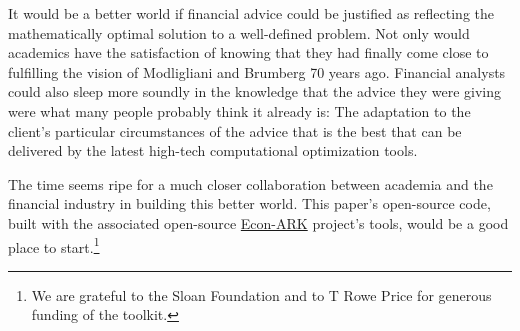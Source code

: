 \documentclass{article}
\begin{document}
It would be a better world if financial advice could be justified as reflecting the mathematically optimal solution to a well-defined problem.  Not only would academics have the satisfaction of knowing that they had finally come close to fulfilling the vision of Modligliani and Brumberg 70 years ago. Financial analysts could also sleep more soundly in the knowledge that the advice they were giving were what many people probably think it already is: The adaptation to the client's particular circumstances of the advice that is the best that can be delivered by the latest high-tech computational optimization tools.

The time seems ripe for a much closer collaboration between academia and the financial industry in building this better world.  This paper's open-source code, built with the associated open-source \href{https://econ-ark.org}{Econ-ARK} project's tools, would be a good place to start.\footnote{We are grateful to the Sloan Foundation and to T Rowe Price for generous funding of the toolkit.}





\end{document}
